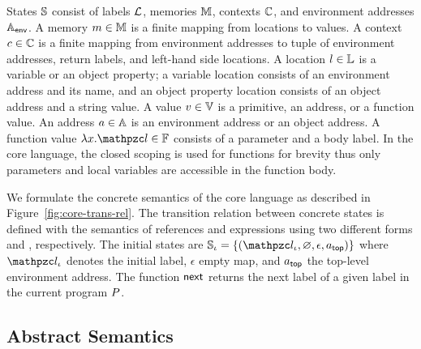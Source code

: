 States $\mathbb{S}$ consist of labels $\mathcal{L}$, memories $\mathbb{M}$, contexts
$\mathbb{C}$, and environment addresses $\mathbb{A}_{\textsf{env}}$.  A memory $m \in \mathbb{M}$
is a finite mapping from locations to values.  A context $c \in \mathbb{C}$ is
a finite mapping from environment addresses to tuple of environment addresses,
return labels, and left-hand side locations.  A location $l \in \mathbb{L}$ is a
variable or an object property; a variable location consists of an environment
address and its name, and an object property location consists of an object
address and a string value.  A value $v \in \mathbb{V}$ is a primitive, an
address, or a function value.  An address $a \in \mathbb{A}$ is an environment
address or an object address.  A function value $\fval{x}{\lab} \in \fvalset$
consists of a parameter and a body label.  In the core language, the closed
scoping is used for functions for brevity thus only parameters and local
variables are accessible in the function body.

We formulate the concrete semantics of the core language as described in
Figure~\ref{fig:core-trans-rel}.  The transition relation between concrete
states is defined with the semantics of references and expressions using two
different forms  and
\fbox{$\exprrule{\st}{\expr}{\val}$}, respectively.  The initial states are
$\istset = \{ (\ilab, \varnothing, \epsilon, \tladdr) \}$ where $\ilab$ denotes
the initial label, $\epsilon$ empty map, and $a_{\textsf{top}}$ the top-level
environment address.  The function $\textsf{next}$ returns the next label of a
given label in the current program $P$.


\subsection{Abstract Semantics}

